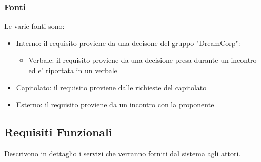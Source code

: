     
    \subsubsection{Fonti}
    Le varie fonti sono:
        \begin{itemize}
            \item Interno: il requisito proviene da una decisone del gruppo "DreamCorp":
                \begin{itemize}
                    \item Verbale: il requisito proviene da una decisione presa durante un incontro ed e' riportata in un verbale
                \end{itemize}
            \item Capitolato: il requisito proviene dalle richieste del capitolato
            \item Esterno: il requisito proviene da un incontro con la proponente
        \end{itemize}
    
		\subsection{Requisiti Funzionali}			
        Descrivono in dettaglio i servizi che verranno forniti dal sistema agli attori.
        
